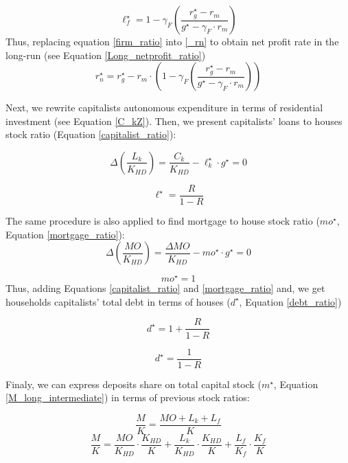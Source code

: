 \documentclass[12pt, a4]{article}
\begin{document}
\begin{equation}
\label{firm_ratio}
\ell_f^\star = 1 - \gamma_F\left(\frac{r_g^\star - r_m}{g^\star - \gamma_F\cdot r_m}\right)
\end{equation}
Thus, replacing equation \ref{firm_ratio} into \ref{_rn} to obtain net profit rate in the long-run (see Equation \ref{Long_netprofit_ratio})
\begin{equation}
\label{Long_netprofit_ratio}
r_n^\star = r_g^\star - r_m\cdot \left(1 - \gamma_F\left(\frac{r_g^\star - r_m}{g^\star - \gamma_F\cdot r_m}\right)\right)
\end{equation}



Next, we rewrite capitalists autonomous expenditure in terms of residential investment (see Equation \ref{C_kZ}). 
Then, we  present capitalists' loans to houses stock ratio (Equation \ref{capitalist_ratio}):

$$
\Delta \left(\frac{L_k}{K_{HD}}\right) = \frac{C_k}{K_{HD}} - \ell^{\star}_{k}\cdot g^{\star} = 0
$$

\begin{equation}
\label{capitalist_ratio}
\ell^\star = \frac{R}{1-R}
\end{equation}

The same procedure is also applied to find mortgage to house stock ratio (\(mo^{\star}\), Equation \ref{mortgage_ratio}):
$$
\Delta \left(\frac{MO}{K_{HD}}\right) = \frac{\Delta MO}{K_{HD}} - mo^{\star}\cdot g^{\star} = 0
$$

\begin{equation}
\label{mortgage_ratio}
mo^\star = 1
\end{equation}
Thus, adding Equations \ref{capitalist_ratio} and \ref{mortgage_ratio} and, we get households capitalists' total debt in terms of houses (\(d^\star\), Equation \ref{debt_ratio})

$$
d^\star = 1 + \frac{R}{1-R}
$$

\begin{equation}
\label{debt_ratio}
d^\star = \frac{1}{1-R}
\end{equation}

Finaly, we can express deposits share on total capital stock (\(m^{\star}\), Equation \ref{M_long_intermediate}) in terms of previous stock ratios:

$$
\frac{M}{K} = \frac{MO + L_k + L_f}{K}
$$
$$
\frac{M}{K} = \frac{MO}{K_{HD}}\cdot \frac{K_{HD}}{K} +  \frac{L_k}{K_{HD}}\cdot \frac{K_{HD}}{K} +  \frac{L_f}{K_{f}}\cdot \frac{K_{f}}{K}
$$
\end{document}
